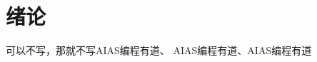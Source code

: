 \chapter{绪论}
\label{chap:introduction}

可以不写，\textcolor[RGB]{202,12,22}{那就不写}\textcolor[RGB]{18,220,168}{AIAS编程有道}、
\textcolor[RGB]{202,12,22}{AIAS编程有道}、\textcolor[RGB]{1,8,9}{AIAS编程有道}
\begin{comment}
\textcolor[RGB]{18,220,168}{AIAS编程有道}、
\textcolor[RGB]{202,12,22}{AIAS编程有道}、\textcolor[RGB]{1,8,9}{AIAS编程有道}

快速入门：本模板的意义是为了让从未接触过\LaTeX 的新手能尽快的上手，熟悉
本模板的使用。因此本文介绍的大部分内容都将以实例的形式给出，您
可以通过目录快速检索感兴趣的内容。作为一个学文论文作者，你的主
要精力应该是论文的内容而不是论文的格式。字体字号对齐方式是否有
背题图和图注是否在同一页参考文献作者是否缩写期刊名是否缩写——
这些不应该成为一个即将具有硕士学位的人花费大量精力去考虑的问题。
这也是本模板要解决的问题。
本说明的结构安排如下：第\ref{chap:introduction}章是一篇简易教程，完整的示例了论文的
一章可能会遇到的各种问题如插图、公式、图形引用、公式引用和文献
的插入及引用。第\ref{chap:figures}章是关于插图的进阶内容，会涉及到图形的不同排
列形式，图形的大小缩放等。第\ref{chap:table}章是关于表格的内容，涉及如何插入表格，
科技文献常用的三线表以及跨页长表格等问题。第\ref{chap:equ}章是关于公式的进阶内容，涉及公式
的编号、对齐、矩阵和方程组的编写等问题。第\ref{chap:bib}章是关于参考文献，
涉及文献的压缩引用，排序等。%
第\ref{chap:unit}章介绍输入数字和物理量的方法。
\end{comment}

